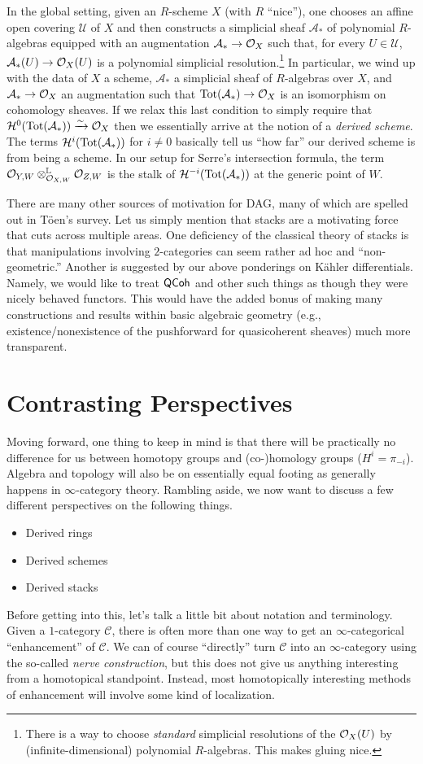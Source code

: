\documentclass[11pt]{article}
\renewcommand{\C}{\mathcal{C}}
\renewcommand{\AA}{\mathcal{A}}
\newcommand{\HH}{\mathcal{H}}
\newcommand{\UU}{\mathscr{U}}
\begin{document}
In the global setting, given an $R$-scheme $X$ (with $R$ ``nice''), one chooses an affine open covering $\UU$ of $X$ and then constructs a simplicial sheaf $\AA_*$ of polynomial $R$-algebras equipped with an augmentation $\AA_*\to\O_X$ such that, for every $U\in\UU$, $\AA_*(U)\to\O_X(U)$ is a polynomial simplicial resolution.\footnote{There is a way to choose \emph{standard} simplicial resolutions of the $\mathcal{O}_X(U)$ by (infinite-dimensional) polynomial $R$-algebras. This makes gluing nice.} In particular, we wind up with the data of $X$ a scheme, $\AA_*$ a simplicial sheaf of $R$-algebras over $X$, and $\AA_*\to\O_X$ an augmentation such that $\Tot(\AA_*)\to\O_X$ is an isomorphism on cohomology sheaves. If we relax this last condition to simply require that $\HH^0(\Tot(\AA_*))\xto{\sim}\O_X$ then we essentially arrive at the notion of a \emph{derived scheme}. The terms $\HH^i(\Tot(\AA_*))$ for $i\neq0$ basically tell us ``how far'' our derived scheme is from being a scheme. In our setup for Serre's intersection formula, the term $\mathcal{O}_{Y,W}\otimes^{\mathbb{L}}_{\mathcal{O}_{X,W}}\mathcal{O}_{Z,W}$ is the stalk of $\HH^{-i}(\Tot(\AA_*))$ at the generic point of $W$.

There are many other sources of motivation for DAG, many of which are spelled out in T\"{o}en's survey. Let us simply mention that stacks are a motivating force that cuts across multiple areas. One deficiency of the classical theory of stacks is that manipulations involving $2$-categories can seem rather ad hoc and ``non-geometric.'' Another is suggested by our above ponderings on K\"{a}hler differentials. Namely, we would like to treat $\operatorname{\mathsf{QCoh}}$ and other such things as though they were nicely behaved functors. This would have the added bonus of making many constructions and results within basic algebraic geometry (e.g., existence/nonexistence of the pushforward for quasicoherent sheaves) much more transparent.

\section{Contrasting Perspectives}
Moving forward, one thing to keep in mind is that there will be practically no difference for us between homotopy groups and (co-)homology groups ($H^i=\pi_{-i}$). Algebra and topology will also be on essentially equal footing as generally happens in $\infty$-category theory. Rambling aside, we now want to discuss a few different perspectives on the following things.
\begin{itemize}
\item Derived rings
\item Derived schemes
\item Derived stacks
\end{itemize}
Before getting into this, let's talk a little bit about notation and terminology. Given a $1$-category $\C$, there is often more than one way to get an $\infty$-categorical ``enhancement'' of $\C$. We can of course ``directly'' turn $\C$ into an $\infty$-category using the so-called \emph{nerve construction}, but this does not give us anything interesting from a homotopical standpoint. Instead, most homotopically interesting methods of enhancement will involve some kind of localization.
\end{document}
